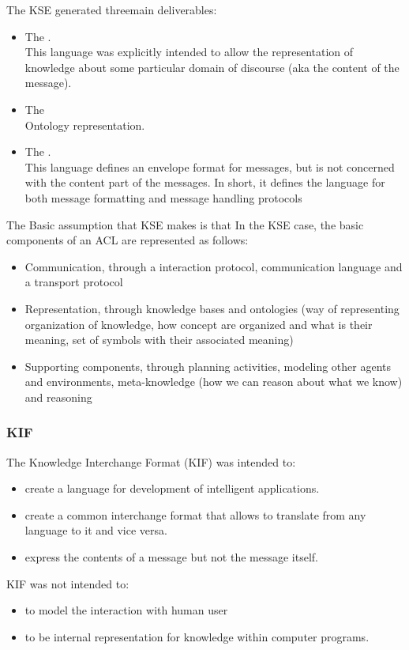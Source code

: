 The KSE generated threemain deliverables:
\begin{itemize}
\item The .\\
This language was explicitly intended to allow the representation of knowledge about some particular domain of discourse (aka the content of the message).
\item The \\
Ontology representation.
\item The . \\
This language defines an envelope format for messages, but is not concerned with the content part of the messages.
In short, it defines the language for both message formatting and message handling protocols
\end{itemize}
The Basic assumption that KSE makes is that 
In the KSE case, the basic components of an ACL are represented as follows:
\begin{itemize}
\item Communication, through a interaction protocol, communication language and a transport protocol
\item Representation, through knowledge bases and ontologies (way of representing organization of knowledge, how concept are organized and what is their meaning, set of symbols with their associated meaning)
\item Supporting components, through planning activities, modeling other agents and environments, meta-knowledge (how we can reason about what we know) and reasoning
\end{itemize}
\subsubsection{KIF}
The Knowledge Interchange Format (KIF) was intended to:
\begin{itemize}
\item  create a language for development of intelligent applications. 
\item create a common interchange format that allows to translate from any language to it and vice versa.
\item  express the contents of a message but not the message itself.
\end{itemize}
KIF was not intended to:
\begin{itemize}
\item to model the interaction with human user
\item to be internal representation for knowledge within computer programs.
\end{itemize}


